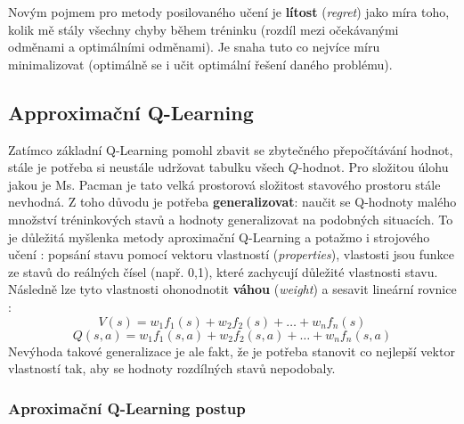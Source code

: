 Novým pojmem pro metody posilovaného učení je \textbf{lítost} (\textit{regret}) jako míra toho, kolik mě stály všechny chyby během tréninku (rozdíl mezi očekávanými odměnami a optimálními odměnami). Je snaha tuto co nejvíce míru minimalizovat (optimálně se i učit optimální řešení daného problému).

\subsection{Approximační Q-Learning}
Zatímco základní Q-Learning pomohl zbavit se zbytečného přepočítávání hodnot, stále je potřeba si neustále udržovat tabulku všech $Q$-hodnot. Pro složitou úlohu jakou je Ms. Pacman je tato velká prostorová složitost stavového prostoru stále nevhodná. Z toho důvodu je potřeba \textbf{generalizovat}: naučit se Q-hodnoty malého množství tréninkových stavů a hodnoty generalizovat na podobných situacích. To je důležitá myšlenka metody aproximační Q-Learning a potažmo i strojového učení \cite{RLAprox}:
\newline
popsání stavu pomocí vektoru vlastností (\textit{properties}), vlastosti jsou funkce ze stavů do reálných čísel (např. 0,1), které zachycují důležité vlastnosti stavu. Následně lze tyto vlastnosti ohonodnotit \textbf{váhou} (\textit{weight}) a sesavit lineární rovnice \cite{RLAprox}:
\begin{displaymath}
V(s) = w_1f_1(s) + w_2f_2(s) + \dots + w_nf_n(s)
\end{displaymath}
\begin{displaymath}
Q(s,a) = w_1f_1(s,a) + w_2f_2(s,a) + \dots + w_nf_n(s,a)
\end{displaymath}
Nevýhoda takové generalizace je ale fakt, že je potřeba stanovit co nejlepší vektor vlastností tak, aby se hodnoty rozdílných stavů nepodobaly.
\subsubsection{Aproximační Q-Learning postup}

